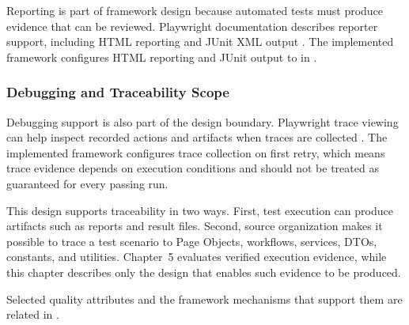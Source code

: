 Reporting is part of framework design because automated tests must produce evidence that can be reviewed. Playwright documentation describes reporter support, including HTML reporting and JUnit XML output \autocite{playwright_docs_reporters_2026}. The implemented framework configures HTML reporting and JUnit output to  in .

\subsubsection{Debugging and Traceability Scope}
\label{subsubsec:ch3-debugging-traceability-scope}

Debugging support is also part of the design boundary. Playwright trace viewing can help inspect recorded actions and artifacts when traces are collected \autocite{playwright_docs_trace_viewer_2026}. The implemented framework configures trace collection on first retry, which means trace evidence depends on execution conditions and should not be treated as guaranteed for every passing run.

This design supports traceability in two ways. First, test execution can produce artifacts such as reports and result files. Second, source organization makes it possible to trace a test scenario to Page Objects, workflows, services, DTOs, constants, and utilities. Chapter~5 evaluates verified execution evidence, while this chapter describes only the design that enables such evidence to be produced.

Selected quality attributes and the framework mechanisms that support them are related in .

